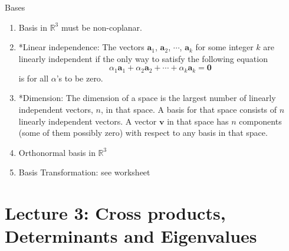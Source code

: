 \documentclass{beamer}
\begin{document}
\begin{frame}[allowframebreaks]{Bases}
	\begin{enumerate}
		\item Basis in $\mathbb{R}^3$ must be \alert{non-coplanar}.
		\item *Linear independence: The vectors $\mathbf{a}_1$, $\mathbf{a}_2$, $\cdots$, $\mathbf{a}_k$ for some integer $k$ are \alert{linearly independent} if the
		only way to satisfy the following equation
		$$\alpha_1\mathbf{a}_1 + \alpha_2\mathbf{a}_2 + \cdots + \alpha_k\mathbf{a}_k = \mathbf{0}$$
		is for all $\alpha$'s to be zero.
		\item *Dimension: The dimension of a space is the largest number of linearly independent vectors, $n$, in that space. A basis for that space consists of $n$ linearly independent vectors. A vector $\mathbf{v}$ in that space has $n$ components (some of them possibly zero) with
		respect to any basis in that space.
		
		\item Orthonormal basis in $\mathbb{R}^3$
		
		\item {\color{green} Basis Transformation}: see worksheet
		
	\end{enumerate}
	
	
\end{frame}






\section{Lecture 3: Cross products, Determinants and Eigenvalues}
\end{document}
